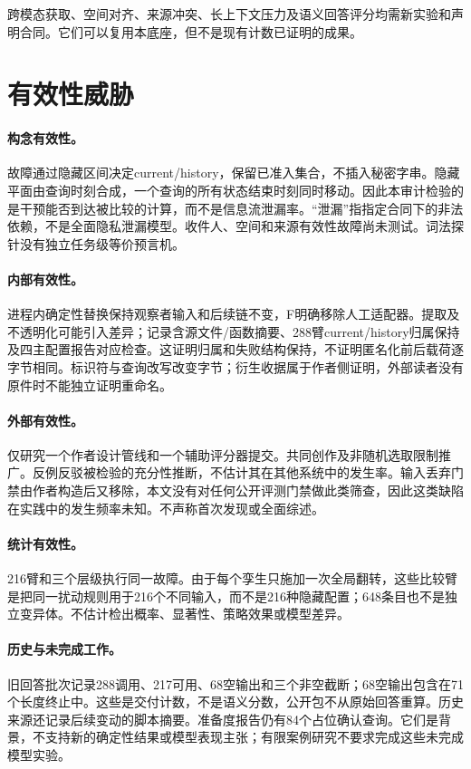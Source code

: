 \documentclass[UTF8,11pt]{ctexart}
\begin{document}
跨模态获取、空间对齐、来源冲突、长上下文压力及语义回答评分均需新实验和声明合同。它们可以复用本底座，但不是现有计数已证明的成果。

\section{有效性威胁}
\paragraph{构念有效性。}
故障通过隐藏区间决定current/history，保留已准入集合，不插入秘密字串。隐藏平面由查询时刻合成，一个查询的所有状态结束时刻同时移动。因此本审计检验的是干预能否到达被比较的计算，而不是信息流泄漏率。“泄漏”指指定合同下的非法依赖，不是全面隐私泄漏模型。收件人、空间和来源有效性故障尚未测试。词法探针没有独立任务级等价预言机。

\paragraph{内部有效性。}
进程内确定性替换保持观察者输入和后续链不变，F明确移除人工适配器。提取及不透明化可能引入差异；记录含源文件/函数摘要、288臂current/history归属保持及四主配置报告对应检查。这证明归属和失败结构保持，不证明匿名化前后载荷逐字节相同。标识符与查询改写改变字节；衍生收据属于作者侧证明，外部读者没有原件时不能独立证明重命名。

\paragraph{外部有效性。}
仅研究一个作者设计管线和一个辅助评分器提交。共同创作及非随机选取限制推广。反例反驳被检验的充分性推断，不估计其在其他系统中的发生率。输入丢弃门禁由作者构造后又移除，本文没有对任何公开评测门禁做此类筛查，因此这类缺陷在实践中的发生频率未知。不声称首次发现或全面综述。

\paragraph{统计有效性。}
216臂和三个层级执行同一故障。由于每个孪生只施加一次全局翻转，这些比较臂是把同一扰动规则用于216个不同输入，而不是216种隐藏配置；648条目也不是独立变异体。不估计检出概率、显著性、策略效果或模型差异。

\paragraph{历史与未完成工作。}
旧回答批次记录288调用、217可用、68空输出和三个非空截断；68空输出包含在71个长度终止中。这些是交付计数，不是语义分数，公开包不从原始回答重算。历史来源还记录后续变动的脚本摘要。准备度报告仍有84个占位确认查询。它们是背景，不支持新的确定性结果或模型表现主张；有限案例研究不要求完成这些未完成模型实验。
\end{document}
